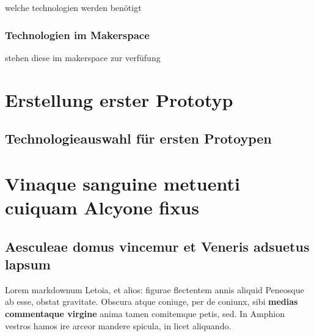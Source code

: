 welche technologien werden benötigt

\hypertarget{technologien-im-makerspace}{%
\subsubsection{Technologien im
Makerspace}\label{technologien-im-makerspace}}

stehen diese im makerspace zur verfüfung

\hypertarget{section}{%
\subsubsection{}\label{section}}

\hypertarget{erstellung-erster-prototyp}{%
\section{Erstellung erster Prototyp}\label{erstellung-erster-prototyp}}

\hypertarget{technologieauswahl-fuxfcr-ersten-protoypen}{%
\subsection{Technologieauswahl für ersten
Protoypen}\label{technologieauswahl-fuxfcr-ersten-protoypen}}

\hypertarget{section-1}{%
\section{}\label{section-1}}

\hypertarget{vinaque-sanguine-metuenti-cuiquam-alcyone-fixus}{%
\section{Vinaque sanguine metuenti cuiquam Alcyone
fixus}\label{vinaque-sanguine-metuenti-cuiquam-alcyone-fixus}}

\hypertarget{aesculeae-domus-vincemur-et-veneris-adsuetus-lapsum}{%
\subsection{Aesculeae domus vincemur et Veneris adsuetus
lapsum}\label{aesculeae-domus-vincemur-et-veneris-adsuetus-lapsum}}

Lorem markdownum Letoia, et alios: figurae flectentem annis aliquid
Peneosque ab esse, obstat gravitate. Obscura atque coniuge, per de
coniunx, sibi \textbf{medias commentaque virgine} anima tamen comitemque
petis, sed. In Amphion vestros hamos ire arceor mandere spicula, in
licet aliquando.

